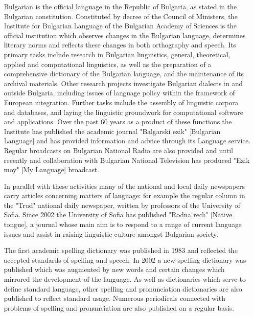 \documentclass[]{../../metanetpaper}
\begin{document}
\begin{multicols}{2}
Bulgarian is the official language in the Republic of Bulgaria, as stated in the Bulgarian constitution. Constituted by decree of the Council of Ministers, the Institute for Bulgarian Language of the Bulgarian Academy of Sciences is the official institution which observes changes in the Bulgarian language, determines literary norms and reflects these changes in both orthography and speech. Its primary tasks include research in Bulgarian linguistics, general, theoretical, applied and computational linguistics, as well as the preparation of a comprehensive dictionary of the Bulgarian language, and the maintenance of its archival materials. Other research projects investigate Bulgarian dialects in and outside Bulgaria, including issues of language policy within the framework of European integration. Further tasks include the assembly of linguistic corpora and databases, and laying the linguistic groundwork for computational software and applications. Over the past 60 years as a 
 product of these functions the Institute has published the academic journal "Balgarski ezik" [Bulgarian Language] and has provided information and advice through its Language service. Regular broadcasts on Bulgarian National Radio are also provided and until recently and collaboration with Bulgarian National Television has produced "Ezik moy" [My Language] broadcast. 

In parallel with these activities many of the national and local daily newspapers carry articles concerning matters of language: for example the regular column in the "Trud" national daily newspaper, written by professors of the University of Sofia. Since 2002 the University of Sofia has published "Rodna rech" [Native tongue], a journal whose main aim is to respond to a range of current language issues and assist in raising linguistic culture amongst Bulgarian society. 


The first academic spelling dictionary was published in 1983 and reflected the accepted standards of spelling and speech. In 2002 a new spelling dictionary was published which was augmented by new words and certain changes which mirrored the development of the language. As well as dictionaries which serve to define standard language, other spelling and pronunciation dictionaries are also published to reflect standard usage. Numerous periodicals connected with problems of spelling and pronunciation are also published on a regular basis. 


\end{multicols}
\end{document}
